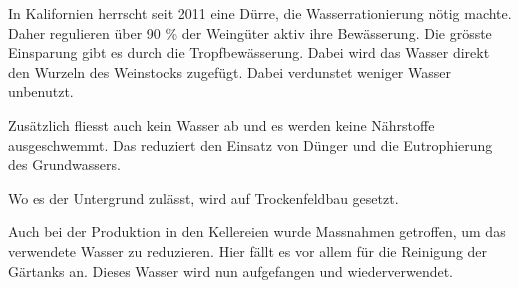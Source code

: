 In Kalifornien
herrscht seit 2011 eine Dürre, die Wasserrationierung nötig machte. Daher regulieren über 90 \% der
Weingüter aktiv ihre Bewässerung. Die grösste Einsparung gibt es durch die Tropfbewässerung. Dabei
wird das Wasser direkt den Wurzeln  des Weinstocks zugefügt. Dabei verdunstet weniger Wasser
unbenutzt.

Zusätzlich fliesst auch kein Wasser ab und es werden keine Nährstoffe ausgeschwemmt. Das reduziert
den Einsatz von Dünger und die Eutrophierung des Grundwassers.

Wo es der Untergrund zulässt, wird auf Trockenfeldbau gesetzt.

\cite{_2015_report_appendix.pdf}


Auch bei der Produktion in den Kellereien wurde Massnahmen getroffen, um das verwendete Wasser zu
reduzieren. Hier fällt es vor allem für die Reinigung der Gärtanks an. Dieses Wasser wird nun
aufgefangen und wiederverwendet.
